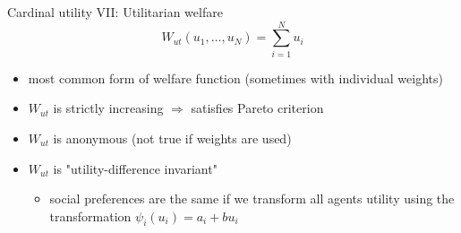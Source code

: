 \documentclass[bigger]{beamer}
\begin{document}
\begin{frame}[label={sec:org625649e}]{Cardinal utility VII: Utilitarian welfare}
$$W_{ut}(u_1,\dots,u_N)=\sum_{i=1}^N u_i$$
\begin{itemize}
\item most common form of welfare function (sometimes with individual weights)
\item \(W_{ut}\) is strictly increasing \(\Rightarrow\) satisfies Pareto criterion
\item \(W_{ut}\) is anonymous (not true if weights are used)
\item \(W_{ut}\) is "utility-difference invariant"
\begin{itemize}
\item social preferences are the same if we transform all agents utility using the transformation \(\psi_i(u_i)=a_i+b u_i\)
\end{itemize}
\end{itemize}
\end{frame}
\end{document}
